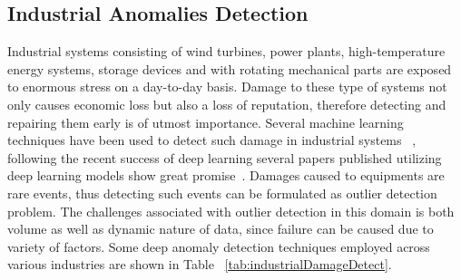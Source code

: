 \subsection{Industrial Anomalies Detection}

Industrial systems consisting of wind turbines, power plants, high-temperature energy systems, storage devices and  with rotating mechanical parts are exposed to enormous stress on a day-to-day basis. Damage to these type of systems not only causes economic loss but also a loss of reputation, therefore detecting and repairing them early is of utmost importance. Several machine learning techniques have been used to detect such damage in industrial systems ~\cite{ramotsoela2018survey,marti2015anomaly}, following the recent success of deep learning several papers published utilizing deep learning models show great promise~\cite{atha2018evaluation,de2018automatic,wang2018residential}. Damages caused to equipments are rare events, thus  detecting such events can be formulated as outlier detection problem. The challenges associated with outlier detection in this domain is both volume as well as dynamic nature of data, since failure can be caused due to variety of factors. Some deep anomaly detection techniques employed across various industries are shown in Table ~\ref{tab:industrialDamageDetect}.



